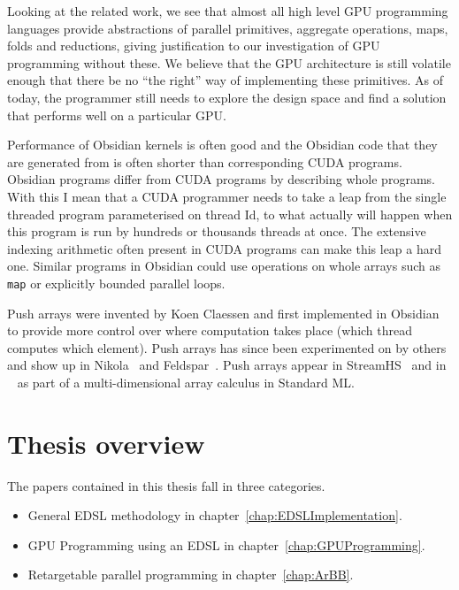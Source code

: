 \documentclass[a4paper]{book}
\begin{document}
Looking at the related work, we see that almost all high level GPU programming 
languages provide abstractions of parallel primitives, aggregate operations, 
maps, folds and reductions, giving justification to our investigation of GPU 
programming without these. We believe that the GPU architecture is still volatile 
enough that there be no ``the right'' way of implementing these primitives. As of 
today, the programmer still needs to explore the design space and find a solution 
that performs well on a particular GPU. 

Performance of Obsidian kernels is often good and the Obsidian code that they 
are generated from is often shorter than corresponding CUDA programs. Obsidian 
programs differ from CUDA programs by describing whole programs. With this I mean 
that a CUDA programmer needs to take a leap from the single threaded program 
parameterised on thread Id, to what actually will happen when this program is 
run by hundreds or thousands threads at once. The extensive indexing arithmetic 
often present in CUDA programs can make this leap a hard one. Similar programs 
in Obsidian could use operations on whole arrays such as {\tt map} or explicitly 
bounded parallel loops. 

Push arrays were invented by Koen Claessen and first implemented in Obsidian 
to provide more control over where computation takes place (which thread computes 
which element). Push arrays has since been experimented on by others and show up 
in Nikola~\citet{NIKOLAPUSH} and Feldspar~\citet{FELDSPARPUSH}. Push arrays appear 
in StreamHS~\citet{FPCDSL} and in ~\citet{MOA} as part of a multi-dimensional array 
calculus in Standard ML. 


%
%
\section{Thesis overview} 


The papers contained in this thesis fall in three categories. 
\begin{itemize} 
\item General EDSL methodology in chapter~\ref{chap:EDSLImplementation}. 
\item GPU Programming using an EDSL in chapter~\ref{chap:GPUProgramming}. 
\item Retargetable parallel programming in chapter~\ref{chap:ArBB}. 
\end{itemize} 
\end{document}

